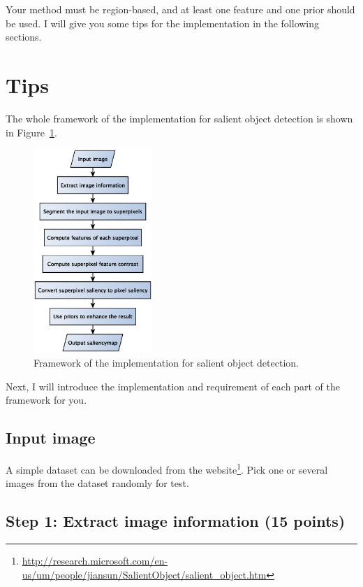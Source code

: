 \documentclass[12pt]{article}
\begin{document}
Your method must be region-based, and at least one feature and one prior should be used. I will give you some tips for the implementation in the following sections.

\section{Tips}

The whole framework of the implementation for salient object detection is shown in Figure~\ref{fig: framework}.

\begin{figure}[!ht]
\centering
\includegraphics[width=0.4\textwidth]{framework.eps}
\caption{Framework of the implementation for salient object detection.}
\label{fig: framework}
\end{figure}

Next, I will introduce the implementation and requirement of each part of the framework for you.

\subsection{Input image}

A simple dataset can be downloaded from the website\footnote{\url{http://research.microsoft.com/en-us/um/people/jiansun/SalientObject/salient_object.htm}}. Pick one or several images from the dataset randomly for test.

\subsection{Step 1: Extract image information (15 points)}
\end{document}
